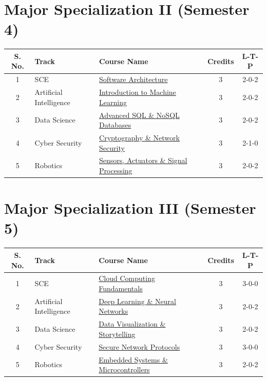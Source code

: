 \label{table:major2}
\section*{Major Specialization II (Semester 4)}
\begin{longtable}{|c|l|p{7cm}|c|c|}
\hline
\textbf{S. No.} & \textbf{Track} & \textbf{Course Name} & \textbf{Credits} & \textbf{L-T-P} \\
\hline
1 & SCE & \hyperref[major:SE_2]{Software Architecture} & 3 & 2-0-2 \\
\hline
2 & Artificial Intelligence & \hyperref[major:ML_2]{Introduction to Machine Learning} & 3 & 2-0-2 \\
\hline
3 & Data Science & \hyperref[major:DS_2]{Advanced SQL \& NoSQL Databases} & 3 & 2-0-2 \\
\hline
4 & Cyber Security & \hyperref[major:CS_2]{Cryptography \& Network Security} & 3 & 2-1-0 \\
\hline
5 & Robotics & \hyperref[major:RB_2]{Sensors, Actuators \& Signal Processing} & 3 & 2-0-2 \\
\hline
\end{longtable}

\label{table:major3}
\section*{Major Specialization III (Semester 5)}
\begin{longtable}{|c|l|p{7cm}|c|c|}
\hline
\textbf{S. No.} & \textbf{Track} & \textbf{Course Name} & \textbf{Credits} & \textbf{L-T-P} \\
\hline
1 & SCE & \hyperref[major:SE_3]{Cloud Computing Fundamentals} & 3 & 3-0-0 \\
\hline
2 & Artificial Intelligence & \hyperref[major:ML_3]{Deep Learning \& Neural Networks} & 3 & 2-0-2 \\
\hline
3 & Data Science & \hyperref[major:DS_3]{Data Visualization \& Storytelling} & 3 & 2-0-2 \\
\hline
4 & Cyber Security & \hyperref[major:CS_3]{Secure Network Protocols} & 3 & 3-0-0 \\
\hline
5 & Robotics & \hyperref[major:RB_3]{Embedded Systems \& Microcontrollers} & 3 & 2-0-2 \\
\hline
\end{longtable}

